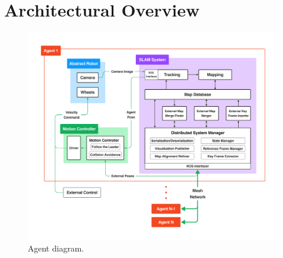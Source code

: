 






\label{sec:3}

\section{Architectural Overview}
\label{sec:architectural-overview}

\begin{figure}[h]
    \centering
    \includegraphics[trim=5cm 5cm 5cm 5cm, scale=0.2]{figures/agent_diagram.pdf}
    \caption{Agent diagram.}
    \label{fig:agent-diagram}
\end{figure}

